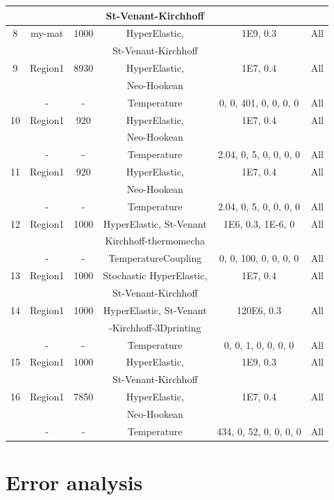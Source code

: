 \documentclass[oneside,11pt,times]{book}
\begin{document}
\begin{table}[!h]
{\begin{tabular}{|c|c|c|c|c|c|}
    & & &  St-Venant-Kirchhoff & & \\
    \hline
        8 & my-mat & 1000 & HyperElastic, & 1E9, 0.3 & All\\
    & & &  St-Venant-Kirchhoff & & \\
    \hline
    9 & Region1 & 8930 & HyperElastic,& 1E7, 0.4 & All\\
    & & &  Neo-Hookean & & \\
     & - & - & Temperature & 0, 0, 401, 0, 0, 0, 0& All\\
    \hline
    10 & Region1 & 920 & HyperElastic,& 1E7, 0.4 & All\\
    & & &  Neo-Hookean & & \\
     & - & - & Temperature & 2.04, 0, 5, 0, 0, 0, 0& All\\
    \hline
    11 & Region1 & 920 & HyperElastic,& 1E7, 0.4 & All\\
    & & &  Neo-Hookean & & \\
     & - & - & Temperature &2.04, 0, 5, 0, 0, 0, 0& All\\
    \hline
    12 & Region1 & 1000 & HyperElastic, St-Venant& 1E6, 0.3, 1E-6, 0& All\\
    & & &  Kirchhoff-thermomecha & & \\
     & - & - & TemperatureCoupling & 0, 0, 100, 0, 0, 0, 0& All\\
    \hline
    13 & Region1 & 1000 & Stochastic HyperElastic,& 1E7, 0.4 & All\\
    & & &  St-Venant-Kirchhoff & & \\
    \hline
    14 & Region1 & 1000 & HyperElastic, St-Venant& 120E6, 0.3 & All\\
    & & &  -Kirchhoff-3Dprinting & & \\
     & - & - & Temperature & 0, 0, 1, 0, 0, 0, 0& All\\
    \hline
    15 & Region1 & 1000 & HyperElastic, & 1E9, 0.3 & All\\
    & & &  St-Venant-Kirchhoff & & \\
    \hline
    16 & Region1 & 7850 & HyperElastic, & 1E7, 0.4 & All\\
    & & &  Neo-Hookean& & \\
     & - & - & Temperature &
     434, 0, 52, 0, 0, 0, 0& All\\
    \hline
    \end{tabular}
    }
\end{table}

\newpage
\section{Error analysis}
\end{document}
